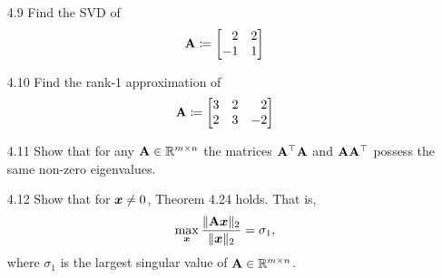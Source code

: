 \documentclass[11pt]{article}
\begin{document}
\begin{enumerate}
          \pagebreak

    \item[4.9] Find the SVD of
          \[
              \mat{A} \coloneq
              \begin{bmatrix*}[r]
                  2 & 2 \\
                  -1 & 1 \\
              \end{bmatrix*}
          \]

    \item[4.10] Find the rank-1 approximation of
          \[
              \mat{A} \coloneq
              \begin{bmatrix*}[r]
                  3 & 2 & 2 \\
                  2 & 3 & -2 \\
              \end{bmatrix*}
          \]

    \item[4.11] Show that for any $\mathbf{A} \in \mathbb{R}^{m \times n}$ the matrices $\mathbf{A}^\top
              \mathbf{A}$ and $\mathbf{A} \mathbf{A}^\top$ possess the same non-zero eigenvalues.

    \item[4.12] Show that for $\bm{x} \neq 0$, Theorem 4.24 holds.  That is,
          \[
              \max_{\bm{x}} \frac{ \lVert\mathbf{A} \bm{x}\rVert_2 }{ \lVert\bm{x}\rVert_2 } = \sigma_1,
          \]
          where $\sigma_1$ is the largest singular value of $\mathbf{A} \in \mathbb{R}^{m \times n}$.

\end{enumerate}
\end{document}
